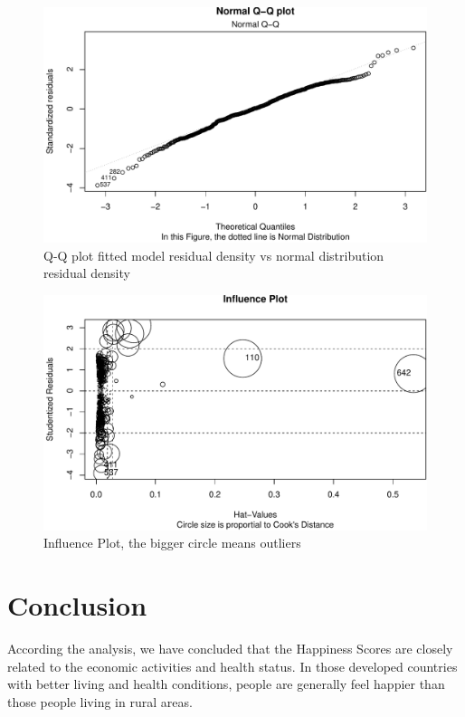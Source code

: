 \documentclass[11pt,a4paper,]{article}
\begin{document}
\begin{figure}
\centering
\includegraphics{Assignment4_files/figure-latex/qq-1.pdf}
\caption{\label{fig:qq}Q-Q plot fitted model residual density vs normal distribution residual density}
\end{figure}

\begin{figure}
\centering
\includegraphics{Assignment4_files/figure-latex/inf-1.pdf}
\caption{\label{fig:inf}Influence Plot, the bigger circle means outliers}
\end{figure}

\clearpage

\hypertarget{conclusion}{%
\section{Conclusion}\label{conclusion}}

According the analysis, we have concluded that the Happiness Scores are closely related to the economic activities and health status. In those developed countries with better living and health conditions, people are generally feel happier than those people living in rural areas.
\end{document}
